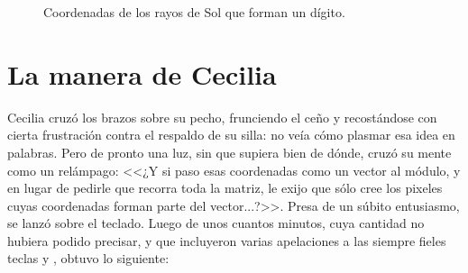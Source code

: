 \begin{figure}[ht]
  \centering
  \hspace{.1\textwidth}
  \caption{Coordenadas de los rayos de Sol que forman un dígito.}
  \label{fig:matriz-posiciones-y-dos}
\end{figure}



\section{La manera de Cecilia}

Cecilia cruzó los brazos sobre su pecho, frunciendo el ceño y
recostándose con cierta frustración contra el respaldo de su silla: no
veía cómo plasmar esa idea en palabras. Pero de pronto una luz, sin
que supiera bien de dónde, cruzó su mente como un relámpago: <<¿Y si
paso esas coordenadas como un vector al módulo, y en lugar de pedirle
que recorra toda la matriz, le exijo que sólo cree los pixeles cuyas
coordenadas forman parte del vector...?>>. Presa de un súbito
entusiasmo, se lanzó sobre el teclado. Luego de unos cuantos minutos,
cuya cantidad no hubiera podido precisar, y que incluyeron varias
apelaciones a las siempre fieles teclas  y
\keystroke{$\Longleftarrow$}, obtuvo lo siguiente:

